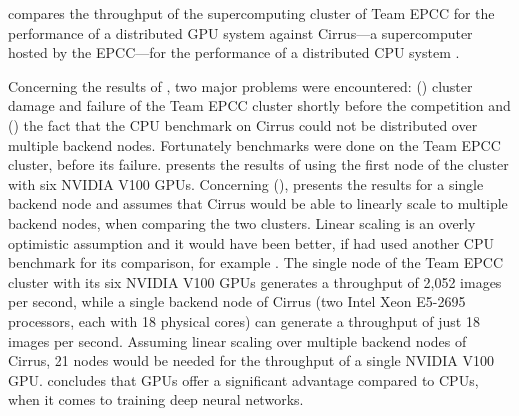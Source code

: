 \documentclass{article}
\begin{document}
\citet{nita_2018} compares the throughput of the
supercomputing cluster of Team EPCC for the performance of
a distributed GPU system against Cirrus---a supercomputer
hosted by the EPCC---for the performance of a distributed
CPU system \citep{cirrus}.

Concerning the results of \citet{nita_2018}, two major
problems were encountered: () cluster
damage and failure of the Team EPCC cluster shortly before
the competition and () the fact that the CPU
benchmark on Cirrus could not be distributed over multiple
backend nodes.
Fortunately benchmarks were done on the Team EPCC cluster,
before its failure.
\citet{nita_2018} presents the results of using the first node of the
cluster with six NVIDIA V100 GPUs.
Concerning (), \citet{nita_2018} presents
the results for a single backend node and assumes that
Cirrus would be able to linearly scale to multiple backend
nodes, when comparing the two clusters.
Linear scaling is an overly optimistic assumption and it would have
been better, if \citet{nita_2018} had used another CPU benchmark for
its comparison, for example \citet{you2017}.
The single node of the Team EPCC cluster with its six
NVIDIA V100 GPUs generates a throughput of 2,052 images per
second, while a single backend node of Cirrus (two Intel
Xeon E5-2695 processors, each with 18 physical cores) can
generate a throughput of just 18 images per second.
Assuming linear scaling over multiple backend nodes of
Cirrus, 21 nodes would be needed for the throughput of a
single NVIDIA V100 GPU.
\citet{nita_2018} concludes that GPUs offer a significant
advantage compared to CPUs, when it comes to training
deep neural networks.
\end{document}
